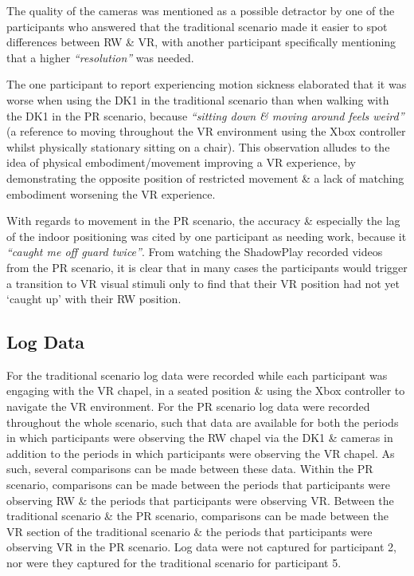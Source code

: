 The quality of the cameras was mentioned as a possible detractor by one of the participants who answered that the traditional scenario made it easier to spot differences between RW \& VR, with another participant specifically mentioning that a higher \textit{``resolution''} was needed.

The one participant to report experiencing motion sickness elaborated that it was worse when using the DK1 in the traditional scenario than when walking with the DK1 in the PR scenario, because \textit{``sitting down \& moving around feels weird''} (a reference to moving throughout the VR environment using the Xbox controller whilst physically stationary sitting on a chair). This observation alludes to the idea of physical embodiment/movement improving a VR experience, by demonstrating the opposite position of restricted movement \& a lack of matching embodiment worsening the VR experience.

With regards to movement in the PR scenario, the accuracy \& especially the lag of the indoor positioning was cited by one participant as needing work, because it \textit{``caught me off guard twice''}. From watching the ShadowPlay recorded videos from the PR scenario, it is clear that in many cases the participants would trigger a transition to VR visual stimuli only to find that their VR position had not yet `caught up' with their RW position.


\subsection{Log Data}

For the traditional scenario log data were recorded while each participant was engaging with the VR chapel, in a seated position \& using the Xbox controller to navigate the VR environment. For the PR scenario log data were recorded throughout the whole scenario, such that data are available for both the periods in which participants were observing the RW chapel via the DK1 \& cameras in addition to the periods in which participants were observing the VR chapel. As such, several comparisons can be made between these data. Within the PR scenario, comparisons can be made between the periods that participants were observing RW \& the periods that participants were observing VR. Between the traditional scenario \& the PR scenario, comparisons can be made between the VR section of the traditional scenario \& the periods that participants were observing VR in the PR scenario. Log data were not captured for participant 2, nor were they captured for the traditional scenario for participant 5.

